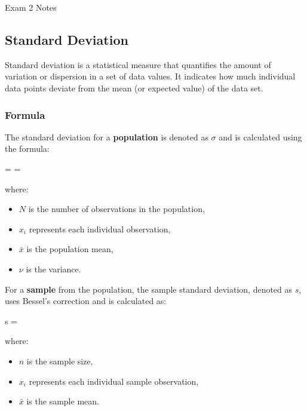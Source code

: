 \begin{examnotes}{Exam 2 Notes}
    \subsection*{Standard Deviation}

    Standard deviation is a statistical measure that quantifies the amount of variation or dispersion in a set of data values. It indicates how much individual data points deviate from the mean 
    (or expected value) of the data set.
    
    \subsubsection*{Formula}
    
    The standard deviation for a \textbf{population} is denoted as $\sigma$ and is calculated using the formula:
    
    \begin{center}
        \begin{highlightbox}
            \sigma =  = 
        \end{highlightbox}
    \end{center}
    
    where:
    \begin{itemize}
        \item $N$ is the number of observations in the population,
        \item $x_i$ represents each individual observation,
        \item $\bar{x}$ is the population mean,
        \item $\nu$ is the variance.
    \end{itemize}
    
    For a \textbf{sample} from the population, the sample standard deviation, denoted as $s$, uses Bessel's correction and is calculated as:
    
    \begin{center}
        \begin{highlightbox}
            s = 
        \end{highlightbox}
    \end{center}
    
    where:
    \begin{itemize}
        \item $n$ is the sample size,
        \item $x_i$ represents each individual sample observation,
        \item $\bar{x}$ is the sample mean.
    \end{itemize}
    

\end{examnotes}
